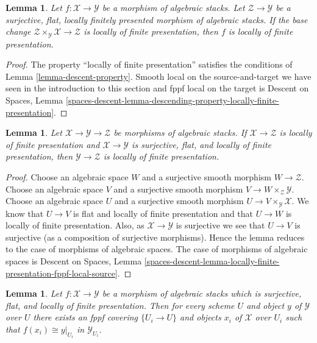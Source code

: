 \documentclass{stacks-project}
\theoremstyle{plain}
\newtheorem{lemma}[subsection]{Lemma}
\theoremstyle{definition}
\theoremstyle{remark}
\numberwithin{equation}{subsection}
\begin{document}
\begin{lemma}
\label{lemma-descent-finite-presentation}
Let $f : \mathcal{X} \to \mathcal{Y}$ be a morphism of algebraic stacks.
Let $\mathcal{Z} \to \mathcal{Y}$ be a surjective, flat, locally finitely
presented morphism of algebraic stacks. If the base change
$\mathcal{Z} \times_\mathcal{Y} \mathcal{X} \to \mathcal{Z}$
is locally of finite presentation, then $f$ is locally of finite
presentation.
\end{lemma}

\begin{proof}
The property
``locally of finite presentation''
satisfies the conditions of Lemma \ref{lemma-descent-property}.
Smooth local on the source-and-target we have seen in the
introduction to this section and fppf local on the target is
Descent on Spaces, Lemma
\ref{spaces-descent-lemma-descending-property-locally-finite-presentation}.
\end{proof}

\begin{lemma}
\label{lemma-flat-finite-presentation-permanence}
Let $\mathcal{X} \to \mathcal{Y} \to \mathcal{Z}$ be morphisms of
algebraic stacks. If $\mathcal{X} \to \mathcal{Z}$ is locally of finite
presentation and $\mathcal{X} \to \mathcal{Y}$ is surjective, flat, and
locally of finite presentation, then $\mathcal{Y} \to \mathcal{Z}$
is locally of finite presentation.
\end{lemma}

\begin{proof}
Choose an algebraic space $W$ and a surjective smooth morphism
$W \to \mathcal{Z}$. Choose an algebraic space $V$ and a surjective smooth
morphism $V \to W \times_\mathcal{Z} \mathcal{Y}$. Choose an algebraic space
$U$ and a surjective smooth morphism $U \to V \times_\mathcal{Y} \mathcal{X}$.
We know that $U \to V$ is flat and locally of finite presentation
and that $U \to W$ is locally of finite presentation.
Also, as $\mathcal{X} \to \mathcal{Y}$ is surjective we see that
$U \to V$ is surjective (as a composition of surjective morphisms).
Hence the lemma reduces to the case of morphisms of algebraic spaces.
The case of morphisms of algebraic spaces is
Descent on Spaces, Lemma
\ref{spaces-descent-lemma-locally-finite-presentation-fppf-local-source}.
\end{proof}

\begin{lemma}
\label{lemma-surjective-flat-locally-finite-presentation}
Let $f : \mathcal{X} \to \mathcal{Y}$ be a morphism of algebraic stacks
which is surjective, flat, and locally of finite presentation.
Then for every scheme $U$ and object $y$ of $\mathcal{Y}$ over $U$
there exists an fppf covering $\{U_i \to U\}$ and objects $x_i$
of $\mathcal{X}$ over $U_i$ such that $f(x_i) \cong y|_{U_i}$ in
$\mathcal{Y}_{U_i}$.
\end{lemma}
\end{document}
